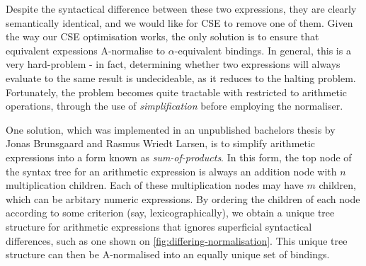 Despite the syntactical difference between these two expressions, they
are clearly semantically identical, and we would like for CSE to
remove one of them.  Given the way our CSE optimisation works, the
only solution is to ensure that equivalent expessions A-normalise to
$\alpha$-equivalent bindings.  In general, this is a very hard-problem
- in fact, determining whether two expressions will always evaluate to
the same result is undecideable, as it reduces to the halting problem.
Fortunately, the problem becomes quite tractable with restricted to
arithmetic operations, through the use of \textit{simplification}
before employing the normaliser.

One solution, which was implemented in an unpublished bachelors thesis
by Jonas Brunsgaard and Rasmus Wriedt Larsen, is to simplify
arithmetic expressions into a form known as \textit{sum-of-products}.
In this form, the top node of the syntax tree for an arithmetic
expression is always an addition node with $n$ multiplication
children.  Each of these multiplication nodes may have $m$ children,
which can be arbitary numeric expressions.  By ordering the children
of each node according to some criterion (say, lexicographically), we
obtain a unique tree structure for arithmetic expressions that ignores
superficial syntactical differences, such as one shown on
\cref{fig:differing-normalisation}.  This unique tree structure can
then be A-normalised into an equally unique set of bindings.

